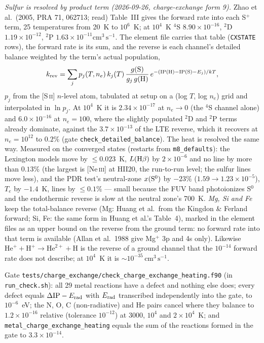 \documentclass[english,a4paper]{my_memo}
\newcommand{\code}[1]{\texttt{#1}}
\newcommand{\cmc}{\mathrm{cm^{3}\,s^{-1}}}
\begin{document}
\emph{Sulfur is resolved by product term (2026-09-26, charge-exchange form
9).}  Zhao et al.\ (2005, PRA 71, 062713; read) Table~III gives the
forward rate into each S$^+$ term, 25 temperatures from 20~K to
$10^6$~K; at $10^4$~K $^4$S $8.90{\times}10^{-16}$, $^2$D
$1.19{\times}10^{-12}$, $^2$P $1.63{\times}10^{-11}\cmc$.  The element
file carries that table (\code{CXSTATE} rows), the forward rate is its
sum, and the reverse is each channel's detailed balance weighted by the
term's actual population,
\begin{equation}
 k_{\rm rev} = \sum_j p_j(T,n_e)\,k_j(T)\,
   \frac{g({\rm S})}{g_j\,g({\rm H})}\,
   e^{-({\rm IP(H)} - {\rm IP(S)} - E_j)/kT},
\end{equation}
$p_j$ from the [S\,\textsc{ii}] $n$-level atom, tabulated at setup on a
(log $T$, log $n_e$) grid and interpolated in $\ln p_j$.  At $10^4$~K it
is $2.34{\times}10^{-17}$ at $n_e\rightarrow0$ (the $^4$S channel alone)
and $6.0{\times}10^{-16}$ at $n_e = 100$, where the slightly populated
$^2$D and $^2$P terms already dominate, against the $3.7{\times}10^{-13}$
of the LTE reverse, which it recovers at $n_e = 10^{12}$ to $0.2\%$ (gate
\code{check\_detailed\_balance}).  The heat is resolved the same way.
Measured on the converged states (restarts from \code{m8\_defaults}): the
Lexington models move by $\le0.023$~K, $L({\rm H}\beta)$ by $2{\times}10^{-6}$
and no line by more than $0.13\%$ (the largest is [Ne\,\textsc{iii}] at HII20,
the run-to-run level; the sulfur lines move less), and
the PDR test's neutral-zone $x({\rm S^0})$ by $-23\%$
($1.59\to1.23{\times}10^{-5}$), $T_e$ by $-1.4$~K, lines by $\le0.1\%$ ---
small because the FUV band photoionizes S$^0$ and the endothermic reverse
is slow at the neutral zone's 700~K.
\emph{Mg, Si and Fe} keep the total-balance reverse (Mg: Huang et al.\ from
the Kingdon \& Ferland forward; Si, Fe: the same form in Huang et al.'s
Table~4), marked in the element files as an upper bound on the reverse
from the ground term: no forward rate into that term is available (Allan
et al.\ 1988 give Mg$^+$ 3p and 4s only).  Likewise
$\mathrm{He}^+ + \mathrm{H}^+ \to \mathrm{He}^{2+} + \mathrm{H}$ is the
reverse of a ground channel that the $10^{-14}$ forward rate does not
describe; at $10^4$~K it is $\sim$$10^{-35}\,\cmc$.

Gate \code{tests/charge\_exchange/check\_charge\_exchange\_heating.f90}
(in \code{run\_check.sh}): all 29 metal reactions have a defect and
nothing else does; every defect equals $\Delta{\rm IP} - E_{\rm rad}$ with
$E_{\rm rad}$ transcribed independently into the gate, to $10^{-6}$~eV; the
N, O, C (non-radiative) and He pairs cancel where they balance to
$1.2{\times}10^{-16}$ relative (tolerance $10^{-12}$) at 3000, $10^4$ and
$2{\times}10^4$~K; and \code{metal\_charge\_exchange\_heating} equals the sum
of the reactions formed in the gate to $3.3{\times}10^{-14}$.
\end{document}
